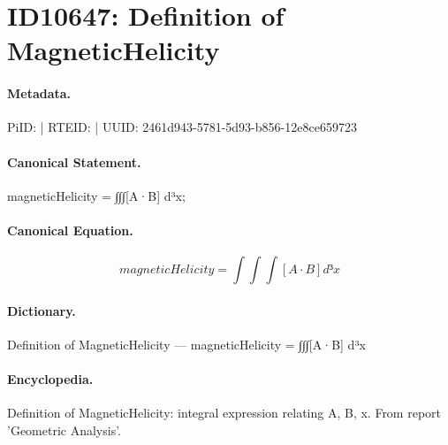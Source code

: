 \section*{ID10647: Definition of MagneticHelicity}
\paragraph{Metadata.}
PiID:  | RTEID:  | UUID: 2461d943-5781-5d93-b856-12e8ce659723

\paragraph{Canonical Statement.}
magneticHelicity = ∫∫∫[A·B] d³x;

\paragraph{Canonical Equation.}
\[
magneticHelicity = ∫∫∫[A·B] d³x
\]

\paragraph{Dictionary.}
Definition of MagneticHelicity — magneticHelicity = ∫∫∫[A·B] d³x

\paragraph{Encyclopedia.}
Definition of MagneticHelicity: integral expression relating A, B, x. From report 'Geometric Analysis'.
